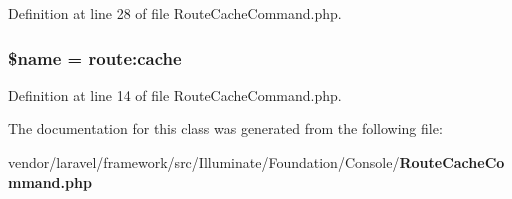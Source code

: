Definition at line 28 of file Route\+Cache\+Command.\+php.

\subsubsection[{\$name}]{\setlength{\rightskip}{0pt plus 5cm}\${\bf name} = \textquotesingle{}route\+:cache\textquotesingle{}\hspace{0.3cm}{\ttfamily [protected]}}\label{class_illuminate_1_1_foundation_1_1_console_1_1_route_cache_command_ab2fc40d43824ea3e1ce5d86dee0d763b}


Definition at line 14 of file Route\+Cache\+Command.\+php.



The documentation for this class was generated from the following file\+:\begin{DoxyCompactItemize}
\item 
vendor/laravel/framework/src/\+Illuminate/\+Foundation/\+Console/{\bf Route\+Cache\+Command.\+php}\end{DoxyCompactItemize}
